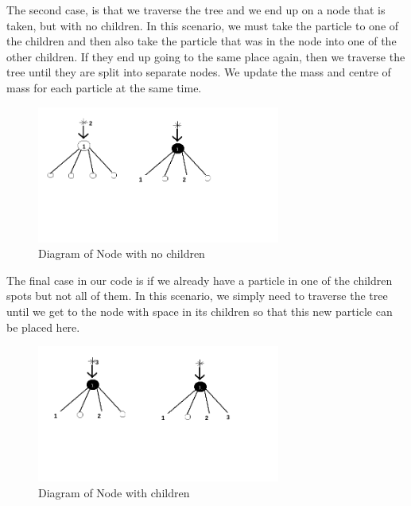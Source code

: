 The second case, is that we traverse the tree and we end up on a node that is taken, but with no children. In this scenario, we must take the particle to one of the children and then also take the particle that was in the node into one of the other children. If they end up going to the same place again, then we traverse the tree until they are split into separate nodes. We update the mass and centre of mass for each particle at the same time.
\begin{figure}[htb]
    \begin{center}
        \includegraphics[width=8cm]{../images/node_no_children.png}
        \caption{Diagram of Node with no children}
    \end{center}
\end{figure}
The final case in our code is if we already have a particle in one of the children spots but not all of them. In this scenario, we simply need to traverse the tree until we get to the node with space in its children so that this new particle can be placed here.
\begin{figure}[htb]
    \begin{center}
        \includegraphics[width=8cm]{../images/children.png}
        \caption{Diagram of Node with children}
    \end{center}
\end{figure}

